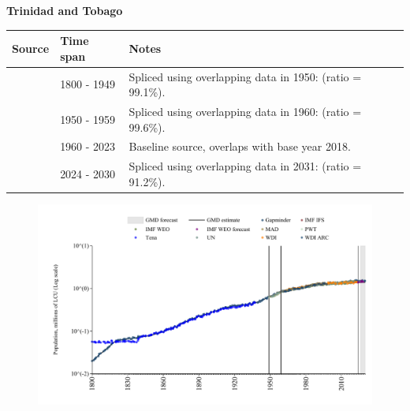 \documentclass[12pt,a4paper,landscape]{article}
\begin{document}
\begin{adjustbox}{max totalsize={\paperwidth}{\paperheight},center}
\begin{minipage}[t][\textheight][t]{\textwidth}
\vspace*{0.5cm}
{}
\begin{center}
{\Large\bfseries Trinidad and Tobago}
\end{center}
\vspace{0.5cm}
\begin{table}[H]
\centering
\small
\begin{tabular}{|l|l|l|}
\hline
\textbf{Source} & \textbf{Time span} & \textbf{Notes} \\
\hline
\rowcolor{white}\cite{Gapminder}& 1800 - 1949 &Spliced using overlapping data in 1950: (ratio = 99.1\%).\\
\rowcolor{lightgray}\cite{IMF_IFS}& 1950 - 1959 &Spliced using overlapping data in 1960: (ratio = 99.6\%).\\
\rowcolor{white}\cite{WDI}& 1960 - 2023 &Baseline source, overlaps with base year 2018.\\
\rowcolor{lightgray}\cite{Gapminder}& 2024 - 2030 &Spliced using overlapping data in 2031: (ratio = 91.2\%).\\
\hline
\end{tabular}
\end{table}
\begin{figure}[H]
\centering
\includegraphics[width=\textwidth,height=0.6\textheight,keepaspectratio]{graphs/TTO_pop.pdf}
\end{figure}
\end{minipage}
\end{adjustbox}
\end{document}
